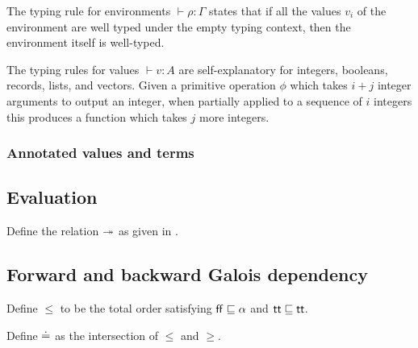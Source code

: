 

The typing rule for environments $\vdash \rho: \Gamma$ states that if all the values $v_i$ of the environment are well typed under the empty typing context, then the environment itself is well-typed. 

The typing rules for values $\vdash v: A$ are self-explanatory for integers, booleans, records, lists, and vectors. Given a primitive operation $\phi$ which takes $i+j$ integer arguments to output an integer, when partially applied to a sequence of $i$ integers this produces a function which takes $j$ more integers.

\subsubsection{Annotated values and terms}






\subsection{Evaluation}




\begin{definition}
   \label{def:core-language:closeDefs}
   Define the relation $\twoheadrightarrow$ as given in .
\end{definition}

\subsection{Forward and backward Galois dependency}



\begin{definition}
   Define $\leq$ to be the total order satisfying $\mathsf{ff} \sqsubseteq \alpha$ and $\mathsf{tt} \sqsubseteq \mathsf{tt}$.
\end{definition}

\begin{definition}
   Define $\doteq$ as the intersection of $\leq$ and $\geq$.
\end{definition}


